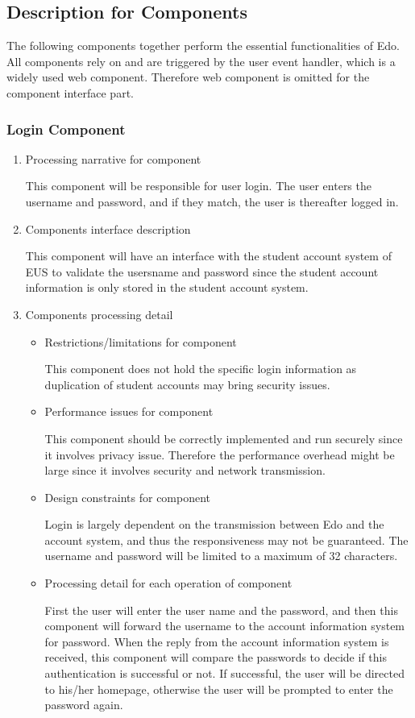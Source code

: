 \documentclass[paper=a4, fontsize=11pt]{scrartcl}
\numberwithin{equation}{section}		%
\numberwithin{figure}{section}			%
\numberwithin{table}{section}				%
\begin{document}
\subsection{Description for Components}

The following components together perform the essential functionalities of Edo. All components rely on and are triggered by the user event handler, which is a widely used web component. Therefore web component is omitted for the component interface part.

\subsubsection{Login Component}
\begin{enumerate}
	\item Processing narrative for component
	\par This component will be responsible for user login. The user enters the username and password, and if they match, the user is thereafter logged in.
	\item Components interface description
	\par This component will have an interface with the student account system of EUS to validate the usersname and password since the student account information is only stored in the student account system.
	\item Components processing detail
	\begin{itemize}
		\item Restrictions/limitations for component
		\par This component does not hold the specific login information as duplication of student accounts may bring security issues.
		\item Performance issues for component 
		\par This component should be correctly implemented and run securely since it involves privacy issue. Therefore the performance overhead might be large since it involves security and network transmission.
		\item Design constraints for component 
		\par Login is largely dependent on the transmission between Edo and the account system, and thus the responsiveness may not be guaranteed. The username and password will be limited to a maximum of 32 characters.
		\item Processing detail for each operation of component 
		\par First the user will enter the user name and the password, and then this component will forward the username to the account information system for password. When the reply from the account information system is received, this component will compare the passwords to decide if this authentication is successful or not. If successful, the user will be directed to his/her homepage, otherwise the user will be prompted to enter the password again.
	\end{itemize}
\end{enumerate}
\end{document}
